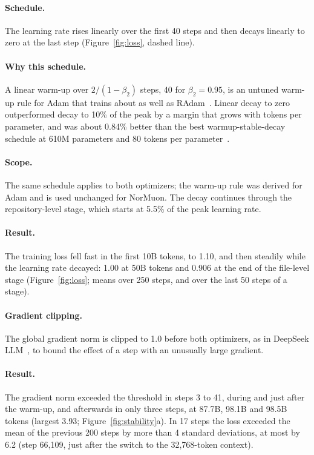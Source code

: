 \documentclass[sigconf,nonacm,balance=false]{acmart}
\begin{document}
\paragraph{Schedule.} The learning rate rises linearly over the first 40 steps and then decays linearly to zero at the
last step (Figure~\ref{fig:loss}, dashed line).

\paragraph{Why this schedule.} A linear warm-up over $2/(1 - \beta_2)$ steps, 40 for $\beta_2 = 0.95$, is an untuned
warm-up rule for Adam that trains about as well as RAdam~\cite{ma2021warmup}. Linear decay to zero outperformed decay
to 10\% of the peak by a margin that grows with tokens per parameter, and was about 0.84\% better than the best
warmup-stable-decay schedule at 610M parameters and 80 tokens per parameter~\cite{bergsma2025d2z}.

\paragraph{Scope.} The same schedule applies to both optimizers; the warm-up rule was derived for Adam and is used
unchanged for NorMuon. The decay continues through the repository-level stage, which starts at 5.5\% of the peak
learning rate.

\paragraph{Result.} The training loss fell fast in the first 10B tokens, to 1.10, and then steadily while the learning
rate decayed: 1.00 at 50B tokens and 0.906 at the end of the file-level stage (Figure~\ref{fig:loss}; means over 250
steps, and over the last 50 steps of a stage).

\paragraph{Gradient clipping.} The global gradient norm is clipped to 1.0 before both optimizers, as in DeepSeek
LLM~\cite{deepseek2024llm}, to bound the effect of a step with an unusually large gradient.

\paragraph{Result.} The gradient norm exceeded the threshold in steps 3 to 41, during and just after the warm-up, and
afterwards in only three steps, at 87.7B, 98.1B and 98.5B tokens (largest 3.93; Figure~\ref{fig:stability}a). In 17
steps the loss exceeded the mean of the previous 200 steps by more than 4 standard deviations, at most by 6.2 (step
66,109, just after the switch to the 32,768-token context).
\end{document}

